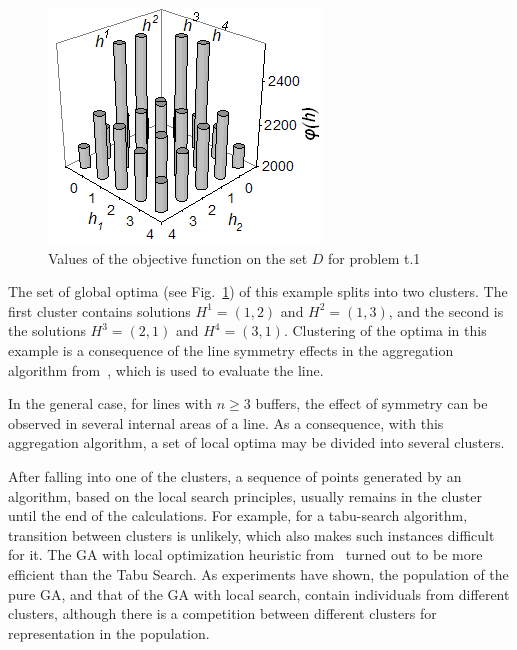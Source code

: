 \documentclass{ifacconf}
\begin{document}
 \begin{figure}[h!]
	\centering
	\includegraphics[scale=0.7]{test}
  \caption{Values of the objective function on the set $D$ for problem t.1\label{t_1}}
  \end{figure}

The set of global optima (see Fig.~\ref{t_1}) of this example splits into two clusters. The
first cluster contains solutions $H^1=(1,2)$ and $H^2=(1,3)$, and
the second is the solutions $H^3=(2,1)$ and $H^4=(3,1)$. Clustering of the optima in
this example is a consequence of the line symmetry effects
in the aggregation algorithm from~\cite{Dolgui93, DF}, which is used to evaluate the line.

In the general case, for lines with $n\geq 3$ buffers, the effect of
symmetry can be observed in several internal areas of a
line. As a consequence, with this aggregation algorithm, a
set of local optima may be divided into several clusters.

After falling into one of the clusters, a sequence of points generated by an algorithm, based on the local search principles,  usually
 remains in the cluster until the end of the calculations. For example, for a tabu-search algorithm, transition between clusters is unlikely, 
 which also makes such instances difficult for it. 
The GA with local optimization heuristic from~\cite{sHBBA2007} turned out to be more efficient than the Tabu Search. 
As experiments have shown, the population of the pure GA, and that of the GA with local search, contain individuals from different clusters,
although there is a competition between different clusters for representation in the population.
\end{document}
